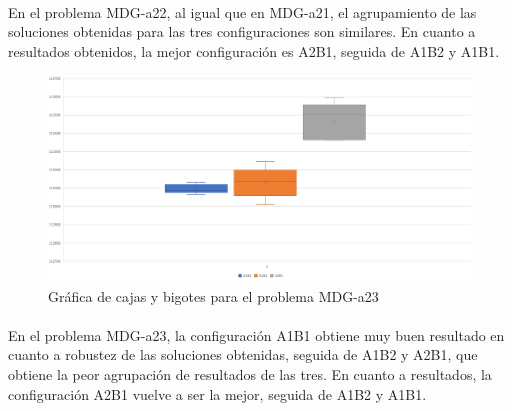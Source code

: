 	\paragraph{}En el problema MDG-a22, al igual que en MDG-a21, el agrupamiento de las soluciones obtenidas para las tres configuraciones son similares. En cuanto a resultados obtenidos, la mejor configuración es A2B1, seguida de A1B2 y A1B1.

	\begin{figure}[H]
		\centering
		\includegraphics[scale=0.3]{img/BIGOTESMDG3.png}
		\caption{Gráfica de cajas y bigotes para el problema MDG-a23}
		\label{MDG-a23_bigotes}
	\end{figure}

	\paragraph{}En el problema MDG-a23, la configuración A1B1 obtiene muy buen resultado en cuanto a robustez de las soluciones obtenidas, seguida de A1B2 y A2B1, que obtiene la peor agrupación de resultados de las tres. En cuanto a resultados, la configuración A2B1 vuelve a ser la mejor, seguida de A1B2 y A1B1.